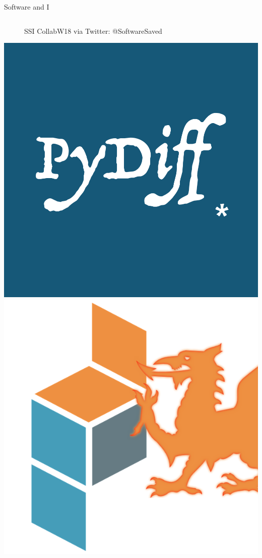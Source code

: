 \documentclass{beamer}
\begin{document}
\begin{frame}{Software and I}
\begin{columns}[T]
\begin{column}{.5\textwidth}
\begin{figure}
                \caption{\tiny SSI CollabW18 via Twitter: @SoftwareSaved}
            \end{figure}
            \includegraphics[width=.4\linewidth]{pydiff.png}%
            \includegraphics[width=.4\linewidth]{pydata.jpg}
        \end{column}
    \end{columns}

\end{frame}
\end{document}
